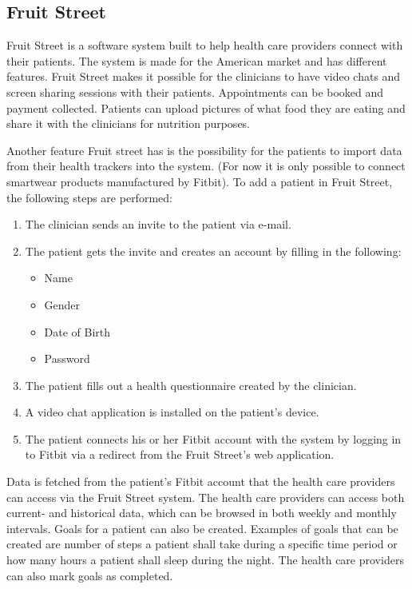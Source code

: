 \documentclass{cslthse-msc}
\begin{document}


\subsection{Fruit Street}

Fruit Street is a software system built to help health care providers connect with their patients. The system is made for the American market and has different features. Fruit Street makes it possible for the clinicians to have video chats and screen sharing sessions with their patients. Appointments can be booked and payment collected. Patients can upload pictures of what food they are eating and share it with the clinicians for nutrition purposes. 

Another feature Fruit street has is the possibility for the patients to import data from their health trackers\cite{FruitStreet} into the system. (For now it is only possible to connect smartwear products manufactured by Fitbit). To add a patient in Fruit Street, the following steps are performed:

\begin{enumerate}
    \item The clinician sends an invite to the patient via e-mail.
    \item The patient gets the invite and creates an account by filling in the following:
\begin{itemize}
    \item Name
    \item Gender
    \item Date of Birth
    \item Password
\end{itemize}
    \item The patient fills out a health questionnaire created by the clinician.
    \item A video chat application is installed on the patient’s device.
    \item The patient connects his or her Fitbit account with the system by logging in to Fitbit via a redirect from the Fruit Street's web application.
\end{enumerate}

Data is fetched from the patient's Fitbit account that the health care providers can access via the Fruit Street system. The health care providers can access both current- and historical data, which can be browsed in both weekly and monthly intervals. Goals for a patient can also be created. Examples of goals that can be created are number of steps a patient shall take during a specific time period or how many hours a patient shall sleep during the night. The health care providers can also mark goals as completed. 
\end{document}
